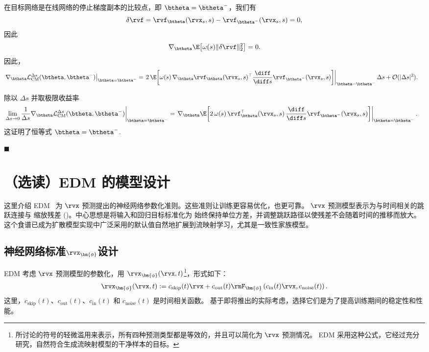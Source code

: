 在目标网络是在线网络的停止梯度副本的比较点，即 $\btheta=\btheta^-$，我们有
\[
\delta \rvf
=
\rvf_{\btheta}(\rvx_s,s)-\rvf_{\btheta^-}(\rvx_s,s)
=
0,
\]
因此
\[
\nabla_{\btheta}\E\!\left[\omega(s)\|\delta \rvf\|_2^2\right]=0.
\]
因此，
\begin{align*}
\left.
\nabla_{\btheta}\mathcal{L}_{\mathrm{CM}}^{\Delta s}(\btheta,\btheta^-)
\right|_{\btheta=\btheta^-}
&=
\left.
2\,\E\!\left[
\omega(s)\,
\nabla_{\btheta}\rvf_{\btheta}(\rvx_s,s)^\top
\frac{\diff}{\diff s}\rvf_{\btheta^-}(\rvx_s,s)
\right]
\right|_{\btheta=\btheta^-}\Delta s
+
\mathcal{O}(|\Delta s|^2).
\end{align*}

除以 $\Delta s$ 并取极限收益率
\begin{align*}
\left.
\lim_{\Delta s\to 0}\frac{1}{\Delta s}\nabla_{\btheta}\mathcal{L}_{\mathrm{CM}}^{\Delta s}(\btheta,\btheta^-)
\right|_{\btheta=\btheta^-}
&=
\left.
\nabla_{\btheta}\E\!\left[
2\,\omega(s)\,
\rvf_{\btheta}^\top(\rvx_s,s)\,
\frac{\diff}{\diff s}\rvf_{\btheta^-}(\rvx_s,s)
\right]
\right|_{\btheta=\btheta^-}.
\end{align*}
这证明了恒等式 $\btheta=\btheta^-$.

\hfill$\blacksquare$


\section{（选读）EDM 的模型设计}\label{sec:edm}
这里介绍 EDM~\citep{karras2022elucidating} 为 $\rvx$ 预测提出的神经网络参数化准则。这些准则让训练更容易优化，也更可靠。
$\rvx$ 预测模型表示为与时间相关的跳跃连接与
缩放残差 ()。中心思想是将输入和回归目标标准化为
始终保持单位方差，并调整跳跃路径以使残差不会随着时间的推移而放大。
 这个食谱已成为扩散模型实现中广泛采用的默认值自然地扩展到流映射学习，尤其是一致性家族模型。


\subsection{神经网络标准$\rvx_{\bm{\phi}}$设计}\label{subsec:D-design-edm}

EDM 考虑 $\rvx$ 预测模型的参数化，用 $\rvx_{\bm{\phi}}(\rvx, t)$\footnote{ 所讨论的符号的轻微滥用来表示，所有四种预测类型都是等效的，并且可以简化为 $\rvx$ 预测情况。 EDM 采用这种公式，它经过充分研究，自然符合生成流映射模型的干净样本的目标。}，形式如下：
\begin{align}\label{eq:D-parametrization}
    \rvx_{\bm{\phi}}(\rvx, t) := c_{\mathrm{skip}}(t) \rvx + c_{\mathrm{out}}(t) \rmF_{\bm{\phi}}\left(c_{\mathrm{in}}(t) \rvx, c_{\mathrm{noise}}(t)\right).
\end{align}
这里，$c_{\mathrm{skip}}(t)$、$c_{\mathrm{out}}(t)$、$c_{\mathrm{in}}(t)$ 和 $c_{\mathrm{noise}}(t)$ 是时间相关函数。
基于即将推出的实际考虑，选择它们是为了提高训练期间的稳定性和性能。


